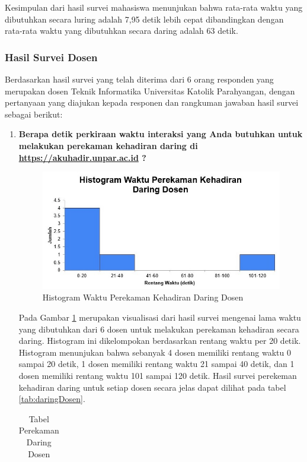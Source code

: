 Kesimpulan dari hasil survei mahasiswa menunjukan bahwa rata-rata waktu yang dibutuhkan secara luring adalah 7,95 detik lebih cepat dibandingkan dengan rata-rata waktu yang dibutuhkan secara daring adalah 63 detik.

\subsubsection{Hasil Survei Dosen}
Berdasarkan hasil survei yang telah diterima dari 6 orang responden yang merupakan dosen Teknik Informatika Universitas Katolik Parahyangan, dengan pertanyaan yang diajukan kepada responen dan rangkuman jawaban hasil survei sebagai berikut:
\begin{enumerate}
	\item \textbf{Berapa detik perkiraan waktu interaksi yang Anda butuhkan untuk melakukan perekaman kehadiran daring di \url{https://akuhadir.unpar.ac.id} ?}
	\begin{figure}[H]
		\centering
		\includegraphics[scale=0.7]{Gambar/DaringDosen.jpg}
		\caption{Histogram Waktu Perekaman Kehadiran Daring Dosen} 
		\label{fig:DaringDosen}
	\end{figure}
	Pada Gambar \ref{fig:DaringDosen} merupakan visualisasi dari hasil survei mengenai lama waktu yang dibutuhkan dari 6 dosen untuk melakukan perekaman kehadiran secara daring. Histogram ini dikelompokan berdasarkan rentang waktu per 20 detik. Histogram menunjukan bahwa sebanyak 4 dosen memiliki rentang waktu 0 sampai 20 detik, 1 dosen memiliki rentang waktu 21 sampai 40 detik, dan 1 dosen memiliki rentang waktu 101 sampai 120 detik. Hasil survei perekeman kehadiran daring untuk setiap dosen secara jelas dapat dilihat pada tabel \ref{tab:daringDosen}.
	\begin{table}[ht]			
		\caption{Tabel Perekaman Daring Dosen}
		\centering
		\begin{tabular}{|p{4cm} |p{7cm}|}\hline

\end{tabular}
\end{table}
\end{enumerate}
